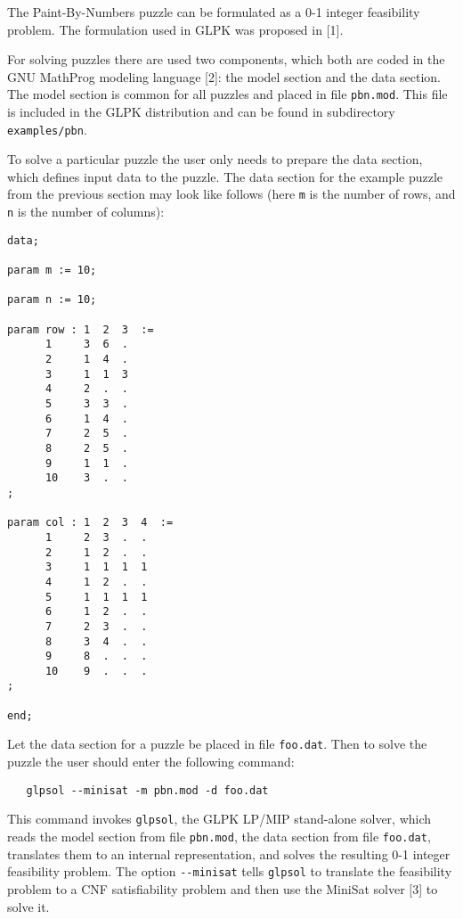 \documentclass[11pt,draft]{article}
\begin{document}
The Paint-By-Numbers puzzle can be formulated as a 0-1 integer
feasibility problem. The formulation used in GLPK was proposed in [1].

For solving puzzles there are used two components, which both are
coded in the GNU MathProg modeling language [2]: the model section and
the data section. The model section is common for all puzzles and
placed in file \verb|pbn.mod|. This file is included in the GLPK
distribution and can be found in subdirectory \verb|examples/pbn|.

To solve a particular puzzle the user only needs to prepare the data
section, which defines input data to the puzzle. The data section for
the example puzzle from the previous section may look like follows
(here \verb|m| is the number of rows, and \verb|n| is the number of
columns):

\begin{footnotesize}
\begin{verbatim}
data;

param m := 10;

param n := 10;

param row : 1  2  3  :=
      1     3  6  .
      2     1  4  .
      3     1  1  3
      4     2  .  .
      5     3  3  .
      6     1  4  .
      7     2  5  .
      8     2  5  .
      9     1  1  .
      10    3  .  .
;

param col : 1  2  3  4  :=
      1     2  3  .  .
      2     1  2  .  .
      3     1  1  1  1
      4     1  2  .  .
      5     1  1  1  1
      6     1  2  .  .
      7     2  3  .  .
      8     3  4  .  .
      9     8  .  .  .
      10    9  .  .  .
;

end;
\end{verbatim}
\end{footnotesize}

\newpage

Let the data section for a puzzle be placed in file \verb|foo.dat|.
Then to solve the puzzle the user should enter the following command:

\begin{verbatim}
   glpsol --minisat -m pbn.mod -d foo.dat
\end{verbatim}

\noindent
This command invokes \verb|glpsol|, the GLPK LP/MIP stand-alone solver,
which reads the model section from file \verb|pbn.mod|, the data section
from file \verb|foo.dat|, translates them to an internal representation,
and solves the resulting 0-1 integer feasibility problem. The option
\verb|--minisat| tells \verb|glpsol| to translate the feasibility
problem to a CNF satisfiability problem and then use the MiniSat solver
[3] to solve it.
\end{document}

